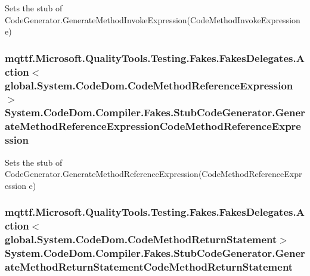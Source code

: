 Sets the stub of Code\-Generator.\-Generate\-Method\-Invoke\-Expression(\-Code\-Method\-Invoke\-Expression e)

\hypertarget{class_system_1_1_code_dom_1_1_compiler_1_1_fakes_1_1_stub_code_generator_aa31e1204fa115d479a03a406b7ecabad}{
\subsubsection[{Generate\-Method\-Reference\-Expression\-Code\-Method\-Reference\-Expression}]{\setlength{\rightskip}{0pt plus 5cm}mqttf.\-Microsoft.\-Quality\-Tools.\-Testing.\-Fakes.\-Fakes\-Delegates.\-Action$<$global.\-System.\-Code\-Dom.\-Code\-Method\-Reference\-Expression$>$ System.\-Code\-Dom.\-Compiler.\-Fakes.\-Stub\-Code\-Generator.\-Generate\-Method\-Reference\-Expression\-Code\-Method\-Reference\-Expression}}\label{class_system_1_1_code_dom_1_1_compiler_1_1_fakes_1_1_stub_code_generator_aa31e1204fa115d479a03a406b7ecabad}


Sets the stub of Code\-Generator.\-Generate\-Method\-Reference\-Expression(\-Code\-Method\-Reference\-Expression e)

\hypertarget{class_system_1_1_code_dom_1_1_compiler_1_1_fakes_1_1_stub_code_generator_a6ce162870c5a40e7fd44008f2d8e5cb3}{
\subsubsection[{Generate\-Method\-Return\-Statement\-Code\-Method\-Return\-Statement}]{\setlength{\rightskip}{0pt plus 5cm}mqttf.\-Microsoft.\-Quality\-Tools.\-Testing.\-Fakes.\-Fakes\-Delegates.\-Action$<$global.\-System.\-Code\-Dom.\-Code\-Method\-Return\-Statement$>$ System.\-Code\-Dom.\-Compiler.\-Fakes.\-Stub\-Code\-Generator.\-Generate\-Method\-Return\-Statement\-Code\-Method\-Return\-Statement}}\label{class_system_1_1_code_dom_1_1_compiler_1_1_fakes_1_1_stub_code_generator_a6ce162870c5a40e7fd44008f2d8e5cb3}



